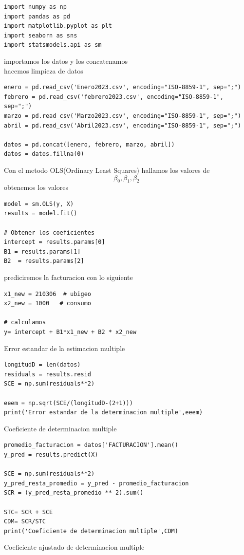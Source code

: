 \documentclass{article}
\begin{document}
\begin{lstlisting}
import numpy as np
import pandas as pd
import matplotlib.pyplot as plt
import seaborn as sns
import statsmodels.api as sm
\end{lstlisting}
importamos los datos y los concatenamos
\\ 
hacemos limpieza de datos 
\begin{lstlisting}
enero = pd.read_csv('Enero2023.csv', encoding="ISO-8859-1", sep=";")
febrero = pd.read_csv('febrero2023.csv', encoding="ISO-8859-1", sep=";")
marzo = pd.read_csv('Marzo2023.csv', encoding="ISO-8859-1", sep=";")
abril = pd.read_csv('Abril2023.csv', encoding="ISO-8859-1", sep=";")

datos = pd.concat([enero, febrero, marzo, abril])
datos = datos.fillna(0)
\end{lstlisting}
Con el metodo OLS(Ordinary Least Squares) hallamos los valores de \[ \beta_0 ,\beta_1, \beta_2 \]
 obtenemos los valores
\begin{lstlisting}
model = sm.OLS(y, X)
results = model.fit()

# Obtener los coeficientes
intercept = results.params[0]
B1 = results.params[1]
B2  = results.params[2]
\end{lstlisting}
prediciremos la facturacion con lo siguiente
\begin{lstlisting}
x1_new = 210306  # ubigeo
x2_new = 1000   # consumo

# calculamos
y= intercept + B1*x1_new + B2 * x2_new
\end{lstlisting}
Error estandar de la estimacion multiple
\begin{lstlisting}
longitudD = len(datos)
residuals = results.resid
SCE = np.sum(residuals**2)

eeem = np.sqrt(SCE/(longitudD-(2+1)))
print('Error estandar de la determinacion multiple',eeem)
\end{lstlisting}
Coeficiente de determinacion multiple

\begin{lstlisting}
promedio_facturacion = datos['FACTURACION'].mean()
y_pred = results.predict(X)

SCE = np.sum(residuals**2)
y_pred_resta_promedio = y_pred - promedio_facturacion
SCR = (y_pred_resta_promedio ** 2).sum()

STC= SCR + SCE
CDM= SCR/STC
print('Coeficiente de determinacion multiple',CDM)
\end{lstlisting}
Coeficiente ajustado de determinacion multiple
\end{document}

